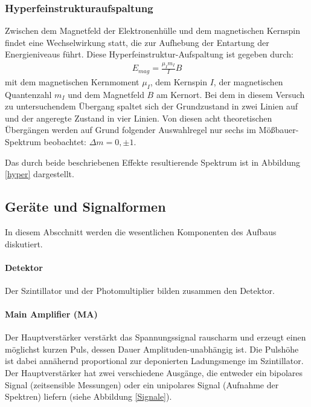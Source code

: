 \subsubsection{Hyperfeinstrukturaufspaltung}\label{hyperfein}

Zwischen dem Magnetfeld der Elektronenhülle und dem magnetischen Kernspin findet eine Wechselwirkung statt, die zur Aufhebung der Entartung der Energieniveaus führt. Diese Hyperfeinstruktur-Aufspaltung 
ist gegeben durch:
\begin{align}
E_{mag} = \frac{\mu_I m_I}{I}B\label{eq:hyperfein}
\end{align}
mit dem magnetischen Kernmoment $\mu_I$, dem Kernspin $I$, der magnetischen Quantenzahl $m_I$ und dem Magnetfeld $B$ am Kernort.
Bei dem in diesem Versuch zu untersuchendem Übergang spaltet sich der Grundzustand in zwei Linien auf und der angeregte Zustand in vier Linien. Von diesen acht theoretischen Übergängen werden auf Grund folgender Auswahlregel nur sechs im Mößbauer-Spektrum beobachtet: $\Delta m =0, \pm 1$.

Das durch beide beschriebenen Effekte resultierende Spektrum ist in Abbildung \ref{hyper} dargestellt.



\subsection{Geräte und Signalformen}
In diesem Abscchnitt werden die wesentlichen Komponenten des Aufbaus diskutiert.\cite{szinti}
\paragraph{Detektor} Der Szintillator und der Photomultiplier bilden zusammen den Detektor.
\paragraph{Main Amplifier (MA)}
Der Hauptverstärker  verstärkt das Spannungssignal rauscharm und erzeugt einen möglichst kurzen Puls, dessen Dauer Amplituden-unabhängig ist. Die Pulshöhe ist dabei annähernd proportional zur deponierten Ladungsmenge im Szintillator. Der Hauptverstärker hat zwei verschiedene Ausgänge, die entweder ein bipolares Signal (zeitsensible Messungen) oder ein unipolares Signal (Aufnahme der Spektren) liefern (siehe Abbildung \ref{Signale}).
